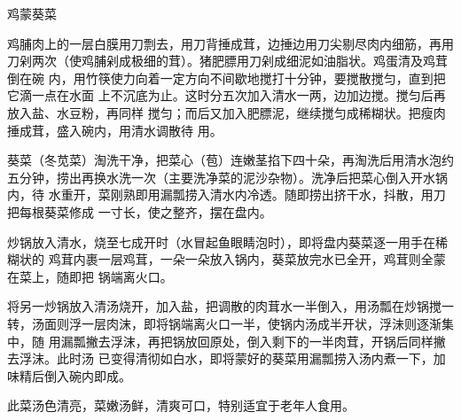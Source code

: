\begin{recipe}{鸡蒙葵菜}

\ingredients


\preparation

\step 鸡脯肉上的一层白膜用刀剽去，用刀背捶成茸，边捶边用刀尖剔尽肉内细筋，再用
刀剁两次（使鸡脯剁成极细的茸）。猪肥膘用刀剁成细泥如油脂状。鸡蛋清及鸡茸倒在碗
内，用竹筷使力向着一定方向不间歇地搅打十分钟，要搅散搅匀，直到把它滴一点在水面
上不沉底为止。这时分五次加入清水一两，边加边搅。搅匀后再放入盐、水豆粉，再同样
搅匀；而后又加入肥膘泥，继续搅匀成稀糊状。把瘦肉捶成茸，盛入碗内，用清水调散待
用。

\step 葵菜（冬苋菜）淘洗干净，把菜心（苞）连嫩茎掐下四十朵，再淘洗后用清水泡约
五分钟，捞出再换水洗一次（主要洗净菜的泥沙杂物）。洗净后把菜心倒入开水锅内，待
水重开，菜刚熟即用漏瓢捞入清水内冷透。随即捞出挤干水，抖散，用刀把每根葵菜修成
一寸长，使之整齐，摆在盘内。

炒锅放入清水，烧至七成开时（水冒起鱼眼睛泡时），即将盘内葵菜逐一用手在稀糊状的
鸡茸内裹一层鸡茸，一朵一朵放入锅内，葵菜放完水已全开，鸡茸则全蒙在菜上，随即把
锅端离火口。

\step 将另一炒锅放入清汤烧开，加入盐，把调散的肉茸水一半倒入，用汤瓢在炒锅搅一
转，汤面则浮一层肉沫，即将锅端离火口一半，使锅内汤成半开状，浮沬则逐渐集中，随
用漏瓢撇去浮沫，再把锅放回原处，倒入剩下的一半肉茸，开锅后同样撇去浮沫。此时汤
已变得清彻如白水，即将蒙好的葵菜用漏瓢捞入汤内煮一下，加味精后倒入碗内即成。

\features

此菜汤色清亮，菜嫩汤鲜，清爽可口，特别适宜于老年人食用。

\end{recipe}

